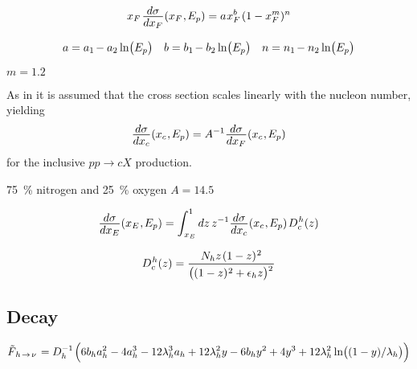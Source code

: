 \begin{equation*}
	x_F \kern+1.0pt \frac{\raisebox{-0.5ex}{$d\sigma$}}{\raisebox{0.5ex}{$dx_F$}} (x_F \kern+0.5pt, \kern-0.5pt E_p)
	= a \kern+0.5pt x_F^b \kern+1.0pt (1 - x_F^m)^n
\end{equation*}

\cite{Goncalves_2007}

\begin{align*}
	a = a_1 \kern-1.0pt - a_2 \ln\bigl(E_p\bigr) && b = b_1 \kern-1.0pt - b_2 \ln\bigl(E_p\bigr) &&
	n = n_1 \kern-1.0pt - n_2 \ln\bigl(E_p\bigr)
\end{align*}

$m = \num{1.2}$ 



As in \cite{Bhattacharya_2015} it is assumed that the cross section scales linearly with the nucleon number, yielding
\begin{equation*}
	\frac{\raisebox{-0.5ex}{$d\sigma$}}{\raisebox{0.5ex}{$dx_c$}} (x_c \kern+0.5pt, \kern-0.5pt E_p) = A^{-1}
	\frac{\raisebox{-0.5ex}{$d\sigma$}}{\raisebox{0.5ex}{$dx_F$}} (x_c \kern+0.5pt, \kern-0.5pt E_p)
\end{equation*}
for the inclusive $pp \rightarrow cX$ production.

\qty{75}{\percent} nitrogen and \qty{25}{\percent} oxygen $A = \num{14.5}$

\begin{equation*}
	\frac{\raisebox{-0.5ex}{$d\sigma$}}{\raisebox{0.5ex}{$dx_E$}} (x_E \kern+0.5pt, \kern-0.5pt E_p) = \int_{\kern+0.5pt x_E}^1 dz \, z^{-1}
	\frac{\raisebox{-0.5ex}{$d\sigma$}}{\raisebox{0.5ex}{$dx_c$}} (x_c \kern+0.5pt, \kern-0.5pt E_p) \kern+1.0pt D^{\kern+0.5pt h}_c (z)
\end{equation*}



\begin{equation}
	D^{\kern+0.5pt h}_{c}(z) = \frac{N_h z \kern+1.0pt (1 - z)^{\kern+0.5pt 2}}
	{\bigl((1 - z)^{\kern+0.5pt 2} + \epsilon_h z \bigl)^{\raisebox{-1.5ex}{$^2$}}}
	\label{eqn:fragmentation}
\end{equation}



\subsection*{Decay}

\begin{equation*}
	\tilde{F}_{\kern+1.0pt h \kern+1.0pt \rightarrow \kern+1.0pt \nu \kern+1.0pt} = D_h^{-1} \kern+1.0pt \Bigl( 6b_ha_h^2 - 4a_h^3
	- 12\lambda_h^3 a_h + 12\lambda_h^2 y - 6b_h y^2 + 4 y^3 + 12 \lambda_h^2 \ln \bigl((1 - y) / \lambda_h \bigr) \Bigr)
\end{equation*}


